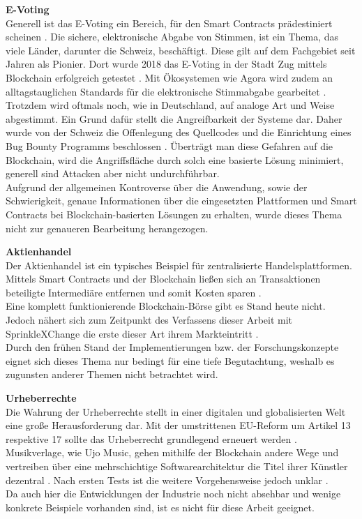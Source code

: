 \textbf{E-Voting}\\
Generell ist das E-Voting ein Bereich, für den Smart Contracts prädestiniert scheinen \cite[vgl. z. B.][]{McCorry2017, Kshetri2018, Yavuz2018}. Die sichere, elektronische Abgabe von Stimmen, ist ein Thema, das viele Länder, darunter die Schweiz, beschäftigt. Diese gilt auf dem Fachgebiet seit Jahren als Pionier. Dort wurde 2018 das E-Voting in der Stadt Zug mittels Blockchain erfolgreich getestet \cite[vgl.][]{luxoft2018}. Mit Ökosystemen wie Agora wird zudem an alltagstauglichen Standards für die elektronische Stimmabgabe gearbeitet \cite[vgl.][]{Agora2019}. Trotzdem wird oftmals noch, wie in Deutschland, auf analoge Art und Weise abgestimmt. Ein Grund dafür stellt die Angreifbarkeit der Systeme dar. Daher wurde von der Schweiz die Offenlegung des Quellcodes und die Einrichtung eines Bug Bounty Programms beschlossen \cite[vgl.][]{Sperlich2019}. Überträgt man diese Gefahren auf die Blockchain, wird die Angriffsfläche durch solch eine basierte Lösung minimiert, generell sind Attacken aber nicht undurchführbar. \\
Aufgrund der allgemeinen Kontroverse über die Anwendung, sowie der Schwierigkeit, genaue Informationen über die eingesetzten Plattformen und Smart Contracts bei Blockchain-basierten Lösungen zu erhalten, wurde dieses Thema nicht zur genaueren Bearbeitung herangezogen.

\textbf{Aktienhandel}\\
Der Aktienhandel ist ein typisches Beispiel für zentralisierte Handelsplattformen. Mittels Smart Contracts und der Blockchain ließen sich an Transaktionen beteiligte Intermediäre entfernen und somit Kosten sparen \cite[vgl.][]{Notheisen2017}.\\
Eine komplett funktionierende Blockchain-Börse gibt es Stand heute nicht. Jedoch nähert sich zum Zeitpunkt des Verfassens dieser Arbeit mit SprinkleXChange die erste dieser Art ihrem Markteintritt \cite[vgl.][]{Hoikkala2019}.\\
Durch den frühen Stand der Implementierungen bzw. der Forschungskonzepte eignet sich dieses Thema nur bedingt für eine tiefe Begutachtung, weshalb es zugunsten anderer Themen nicht betrachtet wird.

\textbf{Urheberrechte}\\
Die Wahrung der Urheberrechte stellt in einer digitalen und globalisierten Welt eine große Herausforderung dar. Mit der umstrittenen EU-Reform um Artikel 13 respektive 17 sollte das Urheberrecht grundlegend erneuert werden \cite[vgl.][]{bpb2019}.\\
Musikverlage, wie Ujo Music, gehen mithilfe der Blockchain andere Wege und vertreiben über eine mehrschichtige Softwarearchitektur die Titel ihrer Künstler dezentral \cite[vgl.][]{Attar2018}. Nach ersten Tests ist die weitere Vorgehensweise jedoch unklar \cite[vgl.][S. 121 f.]{Gilli2019}.\\
Da auch hier die Entwicklungen der Industrie noch nicht absehbar und wenige konkrete Beispiele vorhanden sind, ist es nicht für diese Arbeit geeignet.

